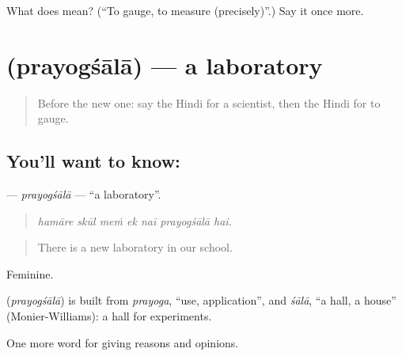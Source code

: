 \begin{tcolorbox}[breakable,colback=teal!4,colframe=teal!35!black,title={Before you move on}]
What does  mean? (\textquotedblleft{}To gauge, to measure (precisely)\textquotedblright{}.) Say it once more.
\end{tcolorbox}
\section[\texorpdfstring{\hi{प्रयोगशाला} (prayogśālā)}{प्रयोगशाला (prayogśālā)}]{ (prayogśālā) — a laboratory}

\label{lesson:HI-C361-prayogsala}



\begin{quote}
Before the new one: say the Hindi for a scientist, then the Hindi for to gauge.
\end{quote}

\subsection*{You'll want to know: }
\textbf{} — \emph{prayogśālā} — \textquotedblleft{}a laboratory\textquotedblright{}.

\begin{quote}
      
\end{quote}

\begin{quote}
\emph{hamāre skūl meṁ ek naī prayogśālā hai.}
\end{quote}

\begin{quote}
There is a new laboratory in our school.
\end{quote}

Feminine.

\begin{cousinweb}
\textbf{} (\emph{prayogśālā}) is built from \emph{prayoga}, \textquotedblleft{}use, application\textquotedblright{}, and \emph{śālā}, \textquotedblleft{}a hall, a house\textquotedblright{} (Monier-Williams): a hall for experiments.
\end{cousinweb}

\begin{grammarlens}[title={What you've built}]
One more word for giving reasons and opinions.
\end{grammarlens}


